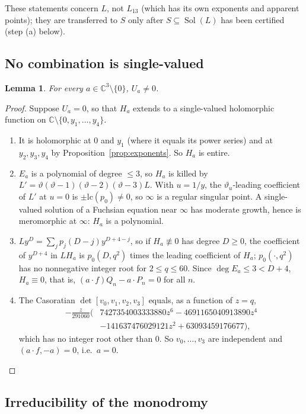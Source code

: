 \documentclass[11pt]{amsart}
\newtheorem{lemma}[proposition]{Lemma}
\theoremstyle{definition}
\theoremstyle{remark}
\numberwithin{equation}{section}
\newcommand{\CC}{\mathbb{C}}
\newcommand{\Sol}{\operatorname{Sol}}
\begin{document}
These statements concern $L$, not $L_{13}$ (which has its own exponents and apparent points); they are transferred to
$S$ only after $S\subseteq\Sol(L)$ has been certified (step (a) below).

\subsection{No combination is single-valued}

\begin{lemma}\label{lem:nonzero}
For every $a\in\CC^3\setminus\{0\}$, $U_a\ne0$.
\end{lemma}

\begin{proof}
Suppose $U_a=0$, so that $H_a$ extends to a single-valued holomorphic function on $\CC\setminus\{0,y_1,\dots,y_4\}$.
\begin{enumerate}
\item It is holomorphic at $0$ and $y_1$ (where it equals its power series) and at $y_2,y_3,y_4$ by
Proposition~\ref{prop:exponents}. So $H_a$ is entire.
\item $E_a$ is a polynomial of degree $\le3$, so $H_a$ is killed by $L'=\vartheta(\vartheta-1)(\vartheta-2)
(\vartheta-3)L$. With $u=1/y$, the $\vartheta_u$-leading coefficient of $L'$ at $u=0$ is $\pm\mathrm{lc}(p_0)\ne0$, so
$\infty$ is a regular singular point. A single-valued solution of a Fuchsian equation near $\infty$ has moderate growth,
hence is meromorphic at $\infty$: $H_a$ is a polynomial.
\item $Ly^D=\sum_jp_j(D-j)y^{D+4-j}$, so if $H_a\not\equiv0$ has degree $D\ge0$, the coefficient of $y^{D+4}$ in $LH_a$
is $p_0(D,q^2)$ times the leading coefficient of $H_a$; $p_0(\cdot,q^2)$ has no nonnegative integer root for
$2\le q\le60$. Since $\deg E_a\le3<D+4$, $H_a\equiv0$, that is, $(a\cdot f)Q_n-a\cdot P_n=0$ for all $n$.
\item The Casoratian $\det[v_0,v_1,v_2,v_3]$ equals, as a function of $z=q$,
\[
\begin{aligned}
-\frac{z}{291060}\bigl(&7427354003333880z^6-4691165040913890z^4\\&-141637476029121z^2+63093459176677\bigr),
\end{aligned}
\]
which has no integer root other than $0$. So $v_0,\dots,v_3$ are independent and $(a\cdot f,-a)=0$, i.e.\ $a=0$.
\qedhere
\end{enumerate}
\end{proof}

\subsection{Irreducibility of the monodromy}\label{sec:irred}
\end{document}
